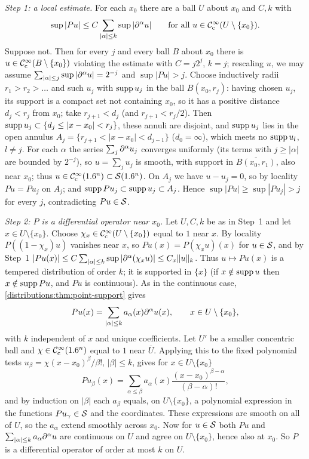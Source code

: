 \emph{Step 1: a local estimate.} For each $x_0$ there are a ball $U$ about $x_0$ and
$C,k$ with
\begin{equation*}
  \sup|Pu|\le C\sum_{|\alpha|\le k}\sup|\partial^\alpha u|\qquad\text{for all }
  u\in\mathcal{C}^\infty_{\mathrm{c}}(U\setminus\{x_0\}).
\end{equation*}
Suppose not. Then for every $j$ and every ball $B$ about $x_0$ there is
$u\in\mathcal{C}^\infty_{\mathrm{c}}(B\setminus\{x_0\})$ violating the estimate with $C=j2^j$, $k=j$; rescaling
$u$, we may assume $\sum_{|\alpha|\le j}\sup|\partial^\alpha u|=2^{-j}$ and $\sup|Pu|>j$. Choose
inductively radii $r_1>r_2>\dots$ and such $u_j$ with $\operatorname{supp} u_j$ in the ball
$B(x_0,r_j)$: having chosen $u_j$, its support is a compact set not containing $x_0$,
so it has a positive distance $d_j<r_j$ from $x_0$; take $r_{j+1}<d_j$ (and
$r_{j+1}<r_j/2$). Then $\operatorname{supp} u_j\subset\{d_j\le|x-x_0|<r_j\}$, these annuli are
disjoint, and $\operatorname{supp} u_j$ lies in the open annulus
$A_j=\{r_{j+1}<|x-x_0|<d_{j-1}\}$ ($d_0=\infty$), which meets no $\operatorname{supp} u_l$, $l\ne j$.
For each $\alpha$ the series $\sum_j\partial^\alpha u_j$ converges uniformly (its terms with
$j\ge|\alpha|$ are bounded by $2^{-j}$), so $u=\sum_ju_j$ is smooth, with support in
$\overline{B(x_0,r_1)}$, also near $x_0$; thus $u\in\mathcal{C}^\infty_{\mathrm{c}}(1.6^n)\subset\mathcal{S}(1.6^n)$. On
$A_j$ we have $u-u_j=0$, so by locality $Pu=Pu_j$ on $A_j$; and $\operatorname{supp} Pu_j\subset
\operatorname{supp} u_j\subset A_j$. Hence $\sup|Pu|\ge\sup|Pu_j|>j$ for every $j$, contradicting
$Pu\in\mathcal{S}$.

\emph{Step 2: $P$ is a differential operator near $x_0$.} Let $U,C,k$ be as in Step~1
and let $x\in U\setminus\{x_0\}$. Choose $\chi_x\in\mathcal{C}^\infty_{\mathrm{c}}(U\setminus\{x_0\})$ equal to $1$
near $x$. By locality $P((1-\chi_x)u)$ vanishes near $x$, so
$Pu(x)=P(\chi_xu)(x)$ for $u\in\mathcal{S}$, and by Step~1
$|Pu(x)|\le C\sum_{|\alpha|\le k}\sup|\partial^\alpha(\chi_xu)|\le C_x\lVert u\rVert_k$. Thus
$u\mapsto Pu(x)$ is a tempered distribution of order $k$; it is supported in $\{x\}$
(if $x\notin\operatorname{supp} u$ then $x\notin\operatorname{supp} Pu$, and $Pu$ is continuous). As in the
continuous case, \cref{distributions:thm:point-support} gives
\begin{equation*}
  Pu(x)=\sum_{|\alpha|\le k}a_\alpha(x)\partial^\alpha u(x),\qquad x\in U\setminus\{x_0\},
\end{equation*}
with $k$ independent of $x$ and unique coefficients. Let $U'$ be a smaller concentric
ball and $\chi\in\mathcal{C}^\infty_{\mathrm{c}}(1.6^n)$ equal to $1$ near $\overline U$. Applying this to the fixed
polynomial tests $u_\beta=\chi(x-x_0)^\beta/\beta!$, $|\beta|\le k$, gives for
$x\in U\setminus\{x_0\}$
\begin{equation*}
  Pu_\beta(x)=\sum_{\alpha\le\beta}a_\alpha(x)\frac{(x-x_0)^{\beta-\alpha}}{(\beta-\alpha)!},
\end{equation*}
and by induction on $|\beta|$ each $a_\beta$ equals, on $U\setminus\{x_0\}$, a polynomial
expression in the functions $Pu_\gamma\in\mathcal{S}$ and the coordinates. These expressions
are smooth on all of $U$, so the $a_\alpha$ extend smoothly across $x_0$. Now for
$u\in\mathcal{S}$ both $Pu$ and $\sum_{|\alpha|\le k}a_\alpha\partial^\alpha u$ are continuous on $U$
and agree on $U\setminus\{x_0\}$, hence also at $x_0$. So $P$ is a differential operator
of order at most $k$ on $U$.

